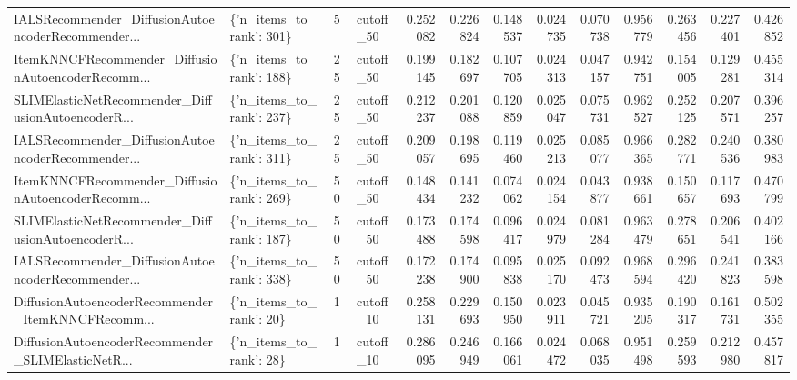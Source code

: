 \begin{tabular}{llllrrrrrrrrr}
IALSRecommender\_DiffusionAutoencoderRecommender... & \{'n\_items\_to\_rank': 301\} &        5 & cutoff\_50 & 0.252082 &   0.226824 & 0.148537 & 0.024735 &        0.070738 &                   0.956779 &       0.263456 &           0.227401 &            0.426852 \\
ItemKNNCFRecommender\_DiffusionAutoencoderRecomm... & \{'n\_items\_to\_rank': 188\} &       25 & cutoff\_50 & 0.199145 &   0.182697 & 0.107705 & 0.024313 &        0.047157 &                   0.942751 &       0.154005 &           0.129281 &            0.455314 \\
SLIMElasticNetRecommender\_DiffusionAutoencoderR... & \{'n\_items\_to\_rank': 237\} &       25 & cutoff\_50 & 0.212237 &   0.201088 & 0.120859 & 0.025047 &        0.075731 &                   0.962527 &       0.252125 &           0.207571 &            0.396257 \\
IALSRecommender\_DiffusionAutoencoderRecommender... & \{'n\_items\_to\_rank': 311\} &       25 & cutoff\_50 & 0.209057 &   0.198695 & 0.119460 & 0.025213 &        0.085077 &                   0.966365 &       0.282771 &           0.240536 &            0.380983 \\
ItemKNNCFRecommender\_DiffusionAutoencoderRecomm... & \{'n\_items\_to\_rank': 269\} &       50 & cutoff\_50 & 0.148434 &   0.141232 & 0.074062 & 0.024154 &        0.043877 &                   0.938661 &       0.150657 &           0.117693 &            0.470799 \\
SLIMElasticNetRecommender\_DiffusionAutoencoderR... & \{'n\_items\_to\_rank': 187\} &       50 & cutoff\_50 & 0.173488 &   0.174598 & 0.096417 & 0.024979 &        0.081284 &                   0.963479 &       0.278651 &           0.206541 &            0.402166 \\
IALSRecommender\_DiffusionAutoencoderRecommender... & \{'n\_items\_to\_rank': 338\} &       50 & cutoff\_50 & 0.172238 &   0.174900 & 0.095838 & 0.025170 &        0.092473 &                   0.968594 &       0.296420 &           0.241823 &            0.383598 \\
DiffusionAutoencoderRecommender\_ItemKNNCFRecomm... &  \{'n\_items\_to\_rank': 20\} &        1 & cutoff\_10 & 0.258131 &   0.229693 & 0.150950 & 0.023911 &        0.045721 &                   0.935205 &       0.190317 &           0.161731 &            0.502355 \\
DiffusionAutoencoderRecommender\_SLIMElasticNetR... &  \{'n\_items\_to\_rank': 28\} &        1 & cutoff\_10 & 0.286095 &   0.246949 & 0.166061 & 0.024472 &        0.068035 &                   0.951498 &       0.259593 &           0.212980 &            0.457817 \\

\end{tabular}
